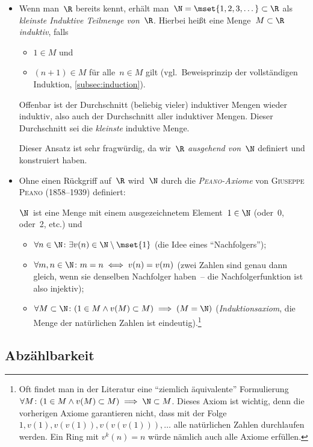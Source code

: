 \documentclass[a4paper]{article}
\begin{document}
\begin{itemize}
    \item Wenn man~$\R$ bereits kennt, erhält man~$\N = \mset{1, 2, 3, \dots} \subset \R$ als \emph{kleinste Induktive Teilmenge von~$\R$}. Hierbei heißt eine Menge~$M \subset \R$ \emph{induktiv}, falls
          \begin{itemize}
              \item $1 \in M$ und
              \item $(n+1) \in M$ für alle~$n \in M$ gilt (vgl.\ Beweisprinzip der vollständigen Induktion, \cref{subsec:induction}).
          \end{itemize}
          Offenbar ist der Durchschnitt (beliebig vieler) induktiver Mengen wieder induktiv, also auch der Durchschnitt aller induktiver Mengen. Dieser Durchschnitt sei die \emph{kleinste} induktive Menge.

          Dieser Ansatz ist sehr fragwürdig, da wir~$\R$ \emph{ausgehend von~$\N$} definiert und konstruiert haben.
    \item Ohne einen Rückgriff auf~$\R$ wird~$\N$ durch die \emph{\textsc{Peano}-Axiome} von \textsc{Giuseppe Peano} (1858--1939) definiert:

          $\N$~ist eine Menge mit einem ausgezeichnetem Element~$1 \in \N$ (oder~0, oder~2, etc.) und
          \begin{itemize}
              \item $\forall n \in \N\colon \exists v(n) \in \N \setminus \mset{1}$ (die Idee eines "`Nachfolgers"');
              \item $\forall m, n \in \N\colon m = n \iff v(n) = v(m)$ (zwei Zahlen sind genau dann gleich, wenn sie denselben Nachfolger haben~-- die Nachfolgerfunktion ist also injektiv);
              \item $\forall M \subset \N\colon (1 \in M \wedge v(M) \subset M) \implies (M = \N)$ (\emph{Induktionsaxiom}, die Menge der natürlichen Zahlen ist eindeutig).\footnote{Oft findet man in der Literatur eine "`ziemlich äquivalente"' Formulierung $\forall M\colon (1 \in M \wedge v(M) \subset M) \implies \N \subset M$. Dieses Axiom ist wichtig, denn die vorherigen Axiome garantieren nicht, dass mit der Folge $1, v(1), v(v(1)), v(v(v(1))), \dots$ alle natürlichen Zahlen durchlaufen werden. Ein Ring mit $v^k(n) = n$ würde nämlich auch alle Axiome erfüllen.}
          \end{itemize}
\end{itemize}

\subsection{Abzählbarkeit}
\end{document}
